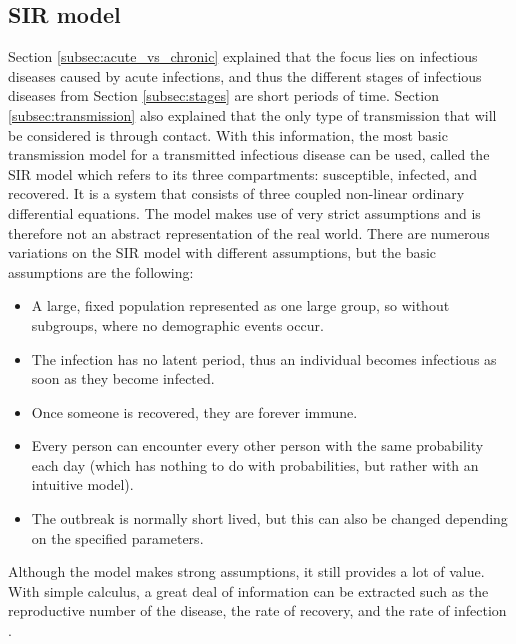 \subsection{SIR model}
\label{subsec:sir_model}
Section \ref{subsec:acute_vs_chronic} explained that the focus lies on infectious diseases caused by acute infections, and thus the different stages of infectious diseases from Section \ref{subsec:stages} are short periods of time. Section \ref{subsec:transmission} also explained that the only type of transmission that will be considered is through contact. With this information, the most basic transmission model for a transmitted infectious disease can be used, called the SIR model which refers to its three compartments: susceptible, infected, and recovered. It is a system that consists of three coupled non-linear ordinary differential equations. The model makes use of very strict assumptions and is therefore not an abstract representation of the real world. There are numerous variations on the SIR model with different assumptions, but the basic assumptions are the following:
\begin{itemize}
    \item A large, fixed population represented as one large group, so without subgroups, where no demographic events occur.
    \item The infection has no latent period, thus an individual becomes infectious as soon as they become infected.
    \item Once someone is recovered, they are forever immune.
    \item Every person can encounter every other person with the same probability each day (which has nothing to do with probabilities, but rather with an intuitive model).
    \item The outbreak is normally short lived, but this can also be changed depending on the specified parameters.
\end{itemize}

\noindent Although the model makes strong assumptions, it still provides a lot of value. With simple calculus, a great deal of information can be extracted such as the reproductive number of the disease, the rate of recovery, and the rate of infection \cite{sir_model_origin}.

